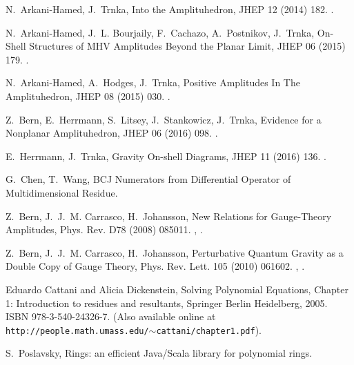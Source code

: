 \documentclass[dvipsnames,preprint,12pt,sort&compress]{elsarticle}
\begin{document}
\begin{thebibliography}{10}
N.~Arkani-Hamed, J.~Trnka, {Into the Amplituhedron}, JHEP 12 (2014) 182.
\newblock \href {http://arxiv.org/abs/1312.7878} {}.

N.~Arkani-Hamed, J.~L. Bourjaily, F.~Cachazo, A.~Postnikov, J.~Trnka, {On-Shell
  Structures of MHV Amplitudes Beyond the Planar Limit}, JHEP 06 (2015) 179.
\newblock \href {http://arxiv.org/abs/1412.8475} {}.

N.~Arkani-Hamed, A.~Hodges, J.~Trnka, {Positive Amplitudes In The
  Amplituhedron}, JHEP 08 (2015) 030.
\newblock \href {http://arxiv.org/abs/1412.8478} {}.

Z.~Bern, E.~Herrmann, S.~Litsey, J.~Stankowicz, J.~Trnka, {Evidence for a
  Nonplanar Amplituhedron}, JHEP 06 (2016) 098.
\newblock \href {http://arxiv.org/abs/1512.08591} {}.

E.~Herrmann, J.~Trnka, {Gravity On-shell Diagrams}, JHEP 11 (2016) 136.
\newblock \href {http://arxiv.org/abs/1604.03479} {}.

G.~Chen, T.~Wang, {BCJ Numerators from Differential Operator of
  Multidimensional Residue}\href {http://arxiv.org/abs/1709.08503}
  {}.

Z.~Bern, J.~J.~M. Carrasco, H.~Johansson, {New Relations for Gauge-Theory
  Amplitudes}, Phys. Rev. D78 (2008) 085011.
\newblock \href {http://arxiv.org/abs/0805.3993} {},
  \href {http://dx.doi.org/10.1103/PhysRevD.78.085011}
  {}.

Z.~Bern, J.~J.~M. Carrasco, H.~Johansson, {Perturbative Quantum Gravity as a
  Double Copy of Gauge Theory}, Phys. Rev. Lett. 105 (2010) 061602.
\newblock \href {http://arxiv.org/abs/1004.0476} {},
  \href {http://dx.doi.org/10.1103/PhysRevLett.105.061602}
  {}.

{Eduardo Cattani and Alicia Dickenstein}, {Solving Polynomial Equations,
  Chapter 1: Introduction to residues and resultants}, Springer Berlin
  Heidelberg, {2005. ISBN 978-3-540-24326-7. (Also available online at
  {\texttt{http://people.math.umass.edu/{$\sim$}cattani/chapter1.pdf}})}.

S.~Poslavsky, {Rings: an efficient Java/Scala library for polynomial
  rings}\href {http://arxiv.org/abs/1712.02329} {}.


\end{thebibliography}
\end{document}
